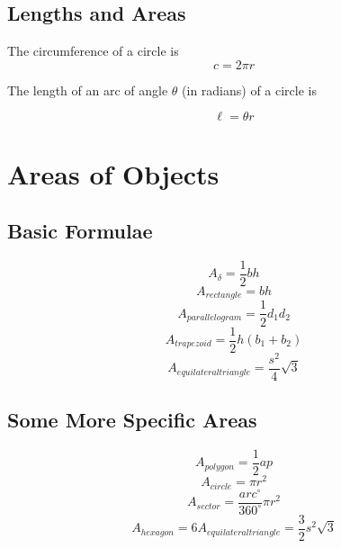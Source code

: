\documentclass[final, letterpaper, 12pt]{article}
\begin{document}
	\subsection{Lengths and Areas}\label{sec: arc lengths and the area of segment and sector}
		The circumference of a circle is 
		\begin{equation}
			c = 2 \pi r
		\end{equation}
		
		The length of an arc of angle $\theta$ (in radians) of a circle is
		
		\begin{equation}
			\ell = \theta r
		\end{equation}		
		
\section{Areas of Objects}
	\subsection{Basic Formulae}\label{sec: basic area formulae}
		\begin{equation}
			A_{\delta} = \frac{1}{2}bh
		\end{equation}
		\begin{equation}
			A_{rectangle} = bh
		\end{equation}
		\begin{equation}
			A_{parallelogram} = \frac{1}{2}d_1d_2
		\end{equation}
		\begin{equation}
			A_{trapezoid} = \frac{1}{2}h\left(b_1 + b_2\right)
		\end{equation}
		\begin{equation}
			A_{equilateral triangle} = \frac{s^2}{4}\sqrt{3}
		\end{equation}
	\subsection{Some More Specific Areas}\label{sec: some interesting area formulae}
		\begin{equation}
			A_{polygon} = \frac{1}{2}ap
		\end{equation}
		\begin{equation}
			A_{circle} = \pi r^2
		\end{equation}
		\begin{equation}
			A_{sector} = \frac{arc ^{\circ}}{360^{\circ}}\pi r^2
		\end{equation}
		\begin{equation}
			A_{hexagon} = 6A_{equilateral triangle} = \frac{3}{2}s^2\sqrt{3}
		\end{equation}
\end{document}
